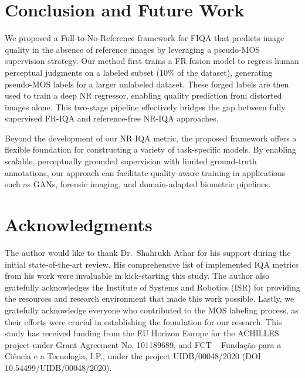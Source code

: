 \section{Conclusion and Future Work}

We proposed a Full-to-No-Reference framework for FIQA that predicts image quality in the absence of reference images by leveraging a pseudo-MOS supervision strategy. Our method first trains a FR fusion model to regress human perceptual judgments on a labeled subset (10\% of the dataset), generating pseudo-MOS labels for a larger unlabeled dataset. These forged labels are then used to train a deep NR regressor, enabling quality prediction from distorted images alone. This two-stage pipeline effectively bridges the gap between fully supervised FR-IQA and reference-free NR-IQA approaches.

Beyond the development of our NR IQA metric, the proposed framework offers a flexible foundation for constructing a variety of task-specific models. By enabling scalable, perceptually grounded supervision with limited ground-truth annotations, our approach can facilitate quality-aware training in applications such as GANs, forensic imaging, and domain-adapted biometric pipelines.

\section{Acknowledgments}

The author would like to thank Dr.\ Shahrukh Athar for his support during the initial state-of-the-art review. His comprehensive list of implemented IQA metrics from his work were invaluable in kick-starting this study.
The author also gratefully acknowledges the Institute of Systems and Robotics (ISR) for providing the resources and research environment that made this work possible.
Lastly, we gratefully acknowledge everyone who contributed to the MOS labeling process, as their efforts were crucial in establishing the foundation for our research.
This study has received funding from the EU Horizon Europe for the  ACHILLES project under Grant Agreement No. 101189689, and FCT -- Fundação para a Ciência e a Tecnologia, I.P., under the project UIDB/00048/2020 (DOI 10.54499/UIDB/00048/2020). %